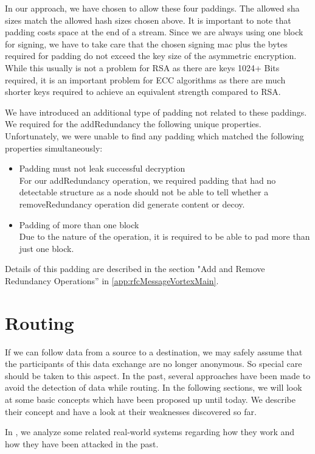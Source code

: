 In our approach, we have chosen to allow these four paddings. The allowed sha sizes match the allowed hash sizes chosen above. It is important to note that padding costs space at the end of a stream. Since we are always using one block for signing, we have to take care that the chosen signing mac plus the bytes required for padding do not exceed the key size of the asymmetric encryption. While this usually is not a problem for RSA as there are keys 1024+ Bits required, it is an important problem for ECC algorithms as there are much shorter keys required to achieve an equivalent strength compared to RSA. 

We have introduced an additional type of padding not related to these paddings. We required for the addRedundancy the following unique properties. Unfortunately, we were unable to find any padding which matched the following properties simultaneously:

\begin{itemize}
	\item Padding must not leak successful decryption\\
	For our addRedundancy operation, we required padding that had no detectable structure as a node should not be able to tell whether a removeRedundancy operation did generate content or decoy. 
	\item Padding of more than one block\\
	Due to the nature of the operation, it is required to be able to pad more than just one block.
\end{itemize}

Details of this padding are described in the section "Add and Remove Redundancy Operations'' in \ref{app:rfcMessageVortexMain}. 

\section{Routing}

If we can follow data from a source to a destination, we may safely assume that the participants of this data exchange are no longer anonymous. So special care should be taken to this aspect. In the past, several approaches have been made to avoid the detection of data while routing. In the following sections, we will look at some basic concepts which have been proposed up until today. We describe their concept and have a look at their weaknesses discovered so far.

In , we analyze some related real-world systems regarding how they work and how they have been attacked in the past.

